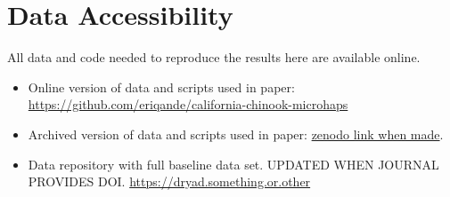 \section*{Data Accessibility}

All data and code needed to reproduce the results here are available online.
\begin{itemize}
\item Online version of data and scripts used in paper: \\
        \url{https://github.com/eriqande/california-chinook-microhaps}
\item Archived version of data and scripts used in paper: \url{zenodo link when made}.
\item Data repository with full baseline data set. UPDATED WHEN JOURNAL PROVIDES DOI. \url{https://dryad.something.or.other}
\end{itemize}
\mbox{}


